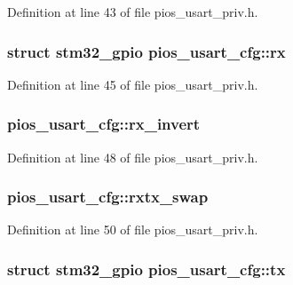 Definition at line 43 of file pios\-\_\-usart\-\_\-priv.\-h.

\hypertarget{structpios__usart__cfg_a8d393f43a5f748de6580907c5f7d0a48}{
\subsubsection[{rx}]{\setlength{\rightskip}{0pt plus 5cm}struct {\bf stm32\-\_\-gpio} pios\-\_\-usart\-\_\-cfg\-::rx}}\label{structpios__usart__cfg_a8d393f43a5f748de6580907c5f7d0a48}


Definition at line 45 of file pios\-\_\-usart\-\_\-priv.\-h.

\hypertarget{structpios__usart__cfg_a89504d674cb5ee30a137ad3d0405c8dd}{
\subsubsection[{rx\-\_\-invert}]{ pios\-\_\-usart\-\_\-cfg\-::rx\-\_\-invert}}\label{structpios__usart__cfg_a89504d674cb5ee30a137ad3d0405c8dd}


Definition at line 48 of file pios\-\_\-usart\-\_\-priv.\-h.

\hypertarget{structpios__usart__cfg_a19b707efa22b300cd9af50ded5e95b6d}{
\subsubsection[{rxtx\-\_\-swap}]{ pios\-\_\-usart\-\_\-cfg\-::rxtx\-\_\-swap}}\label{structpios__usart__cfg_a19b707efa22b300cd9af50ded5e95b6d}


Definition at line 50 of file pios\-\_\-usart\-\_\-priv.\-h.

\hypertarget{structpios__usart__cfg_adc652d014f5c2fd4c1cc152df614ba64}{
\subsubsection[{tx}]{\setlength{\rightskip}{0pt plus 5cm}struct {\bf stm32\-\_\-gpio} pios\-\_\-usart\-\_\-cfg\-::tx}}\label{structpios__usart__cfg_adc652d014f5c2fd4c1cc152df614ba64}


